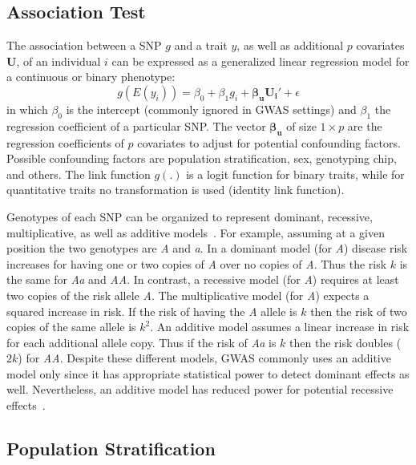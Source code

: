 \subsection{Association Test}
\label{sub:association_test}

The association between a SNP $g$ and a trait $y$, as well as additional $p$ covariates $\bm{U}$, of an individual $i$ can be expressed as a generalized linear regression model for a continuous or binary phenotype:
\begin{equation}
  g(E(y_i)) = \beta_0 + \beta_1g_i + \bm{\beta_u}\bm{U_i'} + \epsilon
\end{equation}
in which $\beta_0$ is the intercept (commonly ignored in GWAS settings) and $\beta_1$ the regression coefficient of a particular SNP\@.
The vector $\bm{\beta_u}$ of size $1\times p$ are the regression coefficients of $p$ covariates to adjust for potential confounding factors.
Possible confounding factors are population stratification, sex, genotyping chip, and others.
The link function $g(.)$ is a logit function for binary traits, while for quantitative traits no transformation is used (identity link function). 

Genotypes of each SNP can be organized to represent dominant, recessive, multiplicative, as well as additive models~\cite{Bush2012}.
For example, assuming at a given position the two genotypes are \textit{A} and \textit{a}.
In a dominant model (for \textit{A}) disease risk increases for having one or two copies of \textit{A} over no copies of \textit{A}.
Thus the risk $k$ is the same for \textit{Aa} and \textit{AA}.
In contrast, a recessive model (for \textit{A}) requires at least two copies of the risk allele \textit{A}.
The multiplicative model (for \textit{A}) expects a squared increase in risk.
If the risk of having the \textit{A} allele is $k$ then the risk of two copies of the same allele is $k^2$.
An additive model assumes a linear increase in risk for each additional allele copy.
Thus if the risk of \textit{Aa} is $k$ then the risk doubles ($2k$) for \textit{AA}. 
Despite these different models, GWAS commonly uses an additive model only since it has appropriate statistical power to detect dominant effects as well.
Nevertheless, an additive model has reduced power for potential recessive effects~\cite{Bush2012}.

\subsection{Population Stratification}
\label{ssec:population_stratification}

